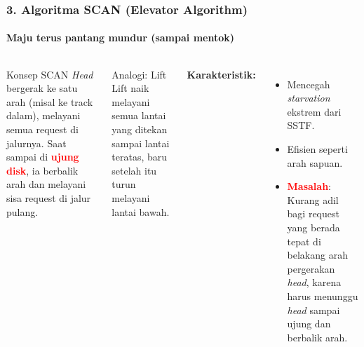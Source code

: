 \documentclass[t,aspectratio=169,xcolor=dvipsnames]{beamer}
\newcommand{\tem}[1]{\textbf{\textcolor{red}{#1}}}
\begin{document}
\begin{frame}
    \frametitle{3. Algoritma SCAN (Elevator Algorithm)}
    \framesubtitle{Maju terus pantang mundur (sampai mentok)}
    \small
    \begin{columns}[T]
        \begin{block}{Konsep SCAN}
            \textit{Head} bergerak ke satu arah (misal ke track dalam), melayani semua request di jalurnya. Saat sampai di \tem{ujung disk}, ia berbalik arah dan melayani sisa request di jalur pulang.
        \end{block}
        
        \begin{exampleblock}{Analogi: Lift}
            Lift naik melayani semua lantai yang ditekan sampai lantai teratas, baru setelah itu turun melayani lantai bawah.
        \end{exampleblock}

        \textbf{Karakteristik:}
        \begin{itemize}
            \item Mencegah \textit{starvation} ekstrem dari SSTF.
            \item Efisien seperti arah sapuan.
            \item \tem{Masalah}: Kurang adil bagi request yang berada tepat di belakang arah pergerakan \textit{head}, karena harus menunggu \textit{head} sampai ujung dan berbalik arah.
        \end{itemize}
    \end{columns}
\end{frame}
\end{document}
